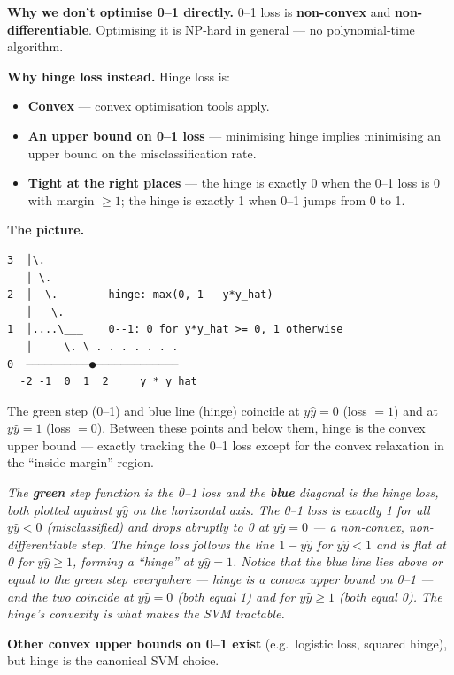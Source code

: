 \documentclass[11pt, a4paper]{article}
\begin{document}
\textbf{Why we don't optimise 0--1 directly.} 0--1 loss is \textbf{non-convex} and \textbf{non-differentiable}. Optimising it is NP-hard in general — no polynomial-time algorithm.

\textbf{Why hinge loss instead.} Hinge loss is:
\begin{itemize}
  \item \textbf{Convex} — convex optimisation tools apply.
  \item \textbf{An upper bound on 0--1 loss} — minimising hinge implies minimising an upper bound on the misclassification rate.
  \item \textbf{Tight at the right places} — the hinge is exactly 0 when the 0--1 loss is 0 with margin $\ge 1$; the hinge is exactly 1 when 0--1 jumps from 0 to 1.
\end{itemize}

\textbf{The picture.}

\begin{verbatim}
3  │\.
   │ \.
2  │  \.        hinge: max(0, 1 - y*y_hat)
   │   \.
1  │....\___    0--1: 0 for y*y_hat >= 0, 1 otherwise
   │     \. \ . . . . . . .
0  ──────────●─────────────
  -2 -1  0  1  2     y * y_hat
\end{verbatim}

The green step (0--1) and blue line (hinge) coincide at $y\hat y = 0$ (loss $= 1$) and at $y\hat y = 1$ (loss $= 0$). Between these points and below them, hinge is the convex upper bound — exactly tracking the 0--1 loss except for the convex relaxation in the ``inside margin'' region.

\begin{center}

\footnotesize\textit{The \textbf{green} step function is the 0--1 loss and the \textbf{blue} diagonal is the hinge loss, both plotted against $y\hat{y}$ on the horizontal axis. The 0--1 loss is exactly 1 for all $y\hat{y} < 0$ (misclassified) and drops abruptly to 0 at $y\hat{y} = 0$ --- a non-convex, non-differentiable step. The hinge loss follows the line $1 - y\hat{y}$ for $y\hat{y} < 1$ and is flat at 0 for $y\hat{y} \ge 1$, forming a ``hinge'' at $y\hat{y} = 1$. Notice that the blue line lies \emph{above or equal to} the green step everywhere --- hinge is a convex upper bound on 0--1 --- and the two coincide at $y\hat{y} = 0$ (both equal 1) and for $y\hat{y} \ge 1$ (both equal 0). The hinge's convexity is what makes the SVM tractable.}
\end{center}

\textbf{Other convex upper bounds on 0--1 exist} (e.g.\ logistic loss, squared hinge), but hinge is the canonical SVM choice.
\end{document}
